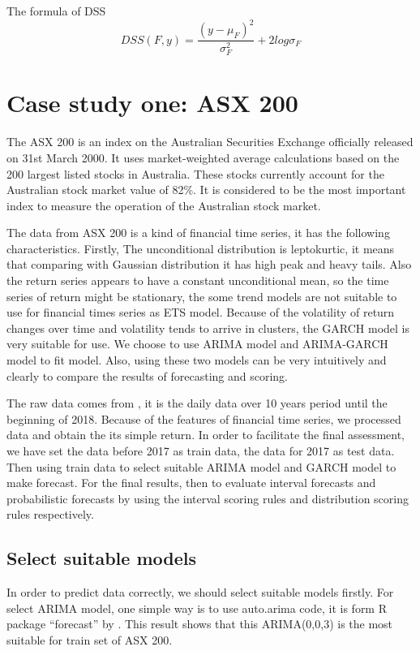 \documentclass{monashthesis}
\theoremstyle{definition}
\theoremstyle{definition}
\theoremstyle{definition}
\theoremstyle{remark}
\begin{document}
The formula of DSS \[
     DSS(F,y)=\frac{(y-\mu_F)^2}{\sigma_F^2}+2log\sigma_F
  \]

\chapter{Case study one: ASX 200}\label{case-study-one-asx-200}

The ASX 200 is an index on the Australian Securities Exchange officially
released on 31st March 2000. It uses market-weighted average
calculations based on the 200 largest listed stocks in Australia. These
stocks currently account for the Australian stock market value of 82\%.
It is considered to be the most important index to measure the operation
of the Australian stock market.

The data from ASX 200 is a kind of financial time series, it has the
following characteristics. Firstly, The unconditional distribution is
leptokurtic, it means that comparing with Gaussian distribution it has
high peak and heavy tails. Also the return series appears to have a
constant unconditional mean, so the time series of return might be
stationary, the some trend models are not suitable to use for financial
times series as ETS model. Because of the volatility of return changes
over time and volatility tends to arrive in clusters, the GARCH model is
very suitable for use. We choose to use ARIMA model and ARIMA-GARCH
model to fit model. Also, using these two models can be very intuitively
and clearly to compare the results of forecasting and scoring.

The raw data comes from \textcite{YH}, it is the daily data over 10
years period until the beginning of 2018. Because of the features of
financial time series, we processed data and obtain the its simple
return. In order to facilitate the final assessment, we have set the
data before 2017 as train data, the data for 2017 as test data. Then
using train data to select suitable ARIMA model and GARCH model to make
forecast. For the final results, then to evaluate interval forecasts and
probabilistic forecasts by using the interval scoring rules and
distribution scoring rules respectively.

\section{Select suitable models}\label{select-suitable-models}

In order to predict data correctly, we should select suitable models
firstly. For select ARIMA model, one simple way is to use auto.arima
code, it is form R package ``forecast'' by \textcite{RH181}. This result
shows that this ARIMA(0,0,3) is the most suitable for train set of ASX
200.
\end{document}
